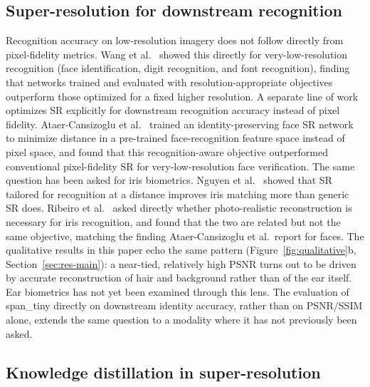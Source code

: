 \documentclass[pdflatex,sn-vancouver-num]{sn-jnl}
\begin{document}
\subsection{Super-resolution for downstream recognition}

Recognition accuracy on low-resolution imagery does not follow directly from pixel-fidelity metrics. Wang et al.~\cite{wang2016vlrr} showed this directly for very-low-resolution recognition (face identification, digit recognition, and font recognition), finding that networks trained and evaluated with resolution-appropriate objectives outperform those optimized for a fixed higher resolution. A separate line of work optimizes SR explicitly for downstream recognition accuracy instead of pixel fidelity. Ataer-Cansizoglu et al.~\cite{ataer2019identity} trained an identity-preserving face SR network to minimize distance in a pre-trained face-recognition feature space instead of pixel space, and found that this recognition-aware objective outperformed conventional pixel-fidelity SR for very-low-resolution face verification. The same question has been asked for iris biometrics. Nguyen et al.~\cite{nguyen2011iris} showed that SR tailored for recognition at a distance improves iris matching more than generic SR does. Ribeiro et al.~\cite{ribeiro2019iris} asked directly whether photo-realistic reconstruction is necessary for iris recognition, and found that the two are related but not the same objective, matching the finding Ataer-Cansizoglu et al.\ report for faces. The qualitative results in this paper echo the same pattern (Figure~\ref{fig:qualitative}b, Section~\ref{sec:res-main}): a near-tied, relatively high PSNR turns out to be driven by accurate reconstruction of hair and background rather than of the ear itself. Ear biometrics has not yet been examined through this lens. The evaluation of span\_tiny directly on downstream identity accuracy, rather than on PSNR/SSIM alone, extends the same question to a modality where it has not previously been asked.

\subsection{Knowledge distillation in super-resolution}
\end{document}
